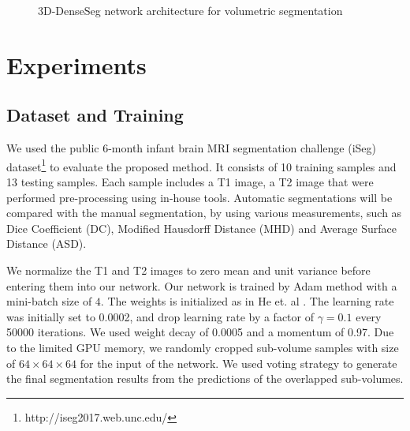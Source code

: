 \documentclass{llncs}
\begin{document}
\begin{figure*}[h]

\caption{3D-DenseSeg network architecture for volumetric segmentation} \label{fig:proposed_network_architecture}
\end{figure*}



\section{Experiments}
\subsection{Dataset and Training} We used the public 6-month infant brain MRI segmentation challenge (iSeg) dataset\footnote{http://iseg2017.web.unc.edu/} to evaluate the proposed method. It consists of 10 training samples and 13 testing samples. Each sample includes a T1 image, a T2 image that were performed pre-processing using in-house tools. Automatic segmentations will be compared with the manual segmentation, by using various measurements, such as Dice Coefficient (DC), Modified Hausdorff Distance (MHD) and Average Surface Distance (ASD).

 We normalize the T1 and T2 images to zero mean and unit variance before entering them into our network. Our network is trained by Adam method \cite{kingma2014adam} with a mini-batch size of $4$. The weights is initialized as in He et. al \cite{he2015delving}. The learning rate was initially set to 0.0002, and drop learning rate by a factor of $\gamma=0.1$ every 50000 iterations. We used weight decay of 0.0005 and a momentum of 0.97. Due to the limited GPU memory, we randomly cropped sub-volume samples with size of $64\times 64 \times 64$ for the input of the network. We used voting strategy to generate the final segmentation results from the predictions of the overlapped sub-volumes. 
\end{document}
